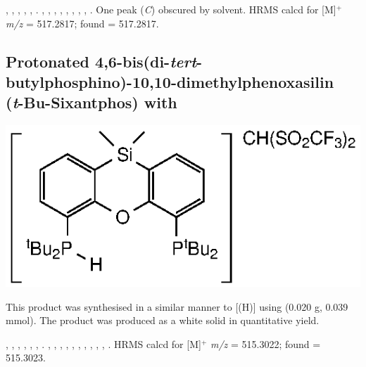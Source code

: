,
,
,
,
,
.
,
,
,
,
,
,
,
,
.
One peak (\emph{C}) obscured by solvent.
HRMS calcd for  [M]$^+$ \emph{m/z} = 517.2817; found = 517.2817.


\subsection*{Protonated 4,6-bis(di-\emph{tert}-butylphosphino)-10,10-dimethylphenoxasilin\\(\emph{t}-Bu-Sixantphos) with }

\begin{structure}[h]
\begin{center}
\includegraphics{../Structures/SitBuH.eps}
\end{center}
\end{structure}

This product was synthesised in a similar manner to [\tBuxantphos(H)] using \tBusixantphos{} (0.020 g, 0.039 mmol).  The product was produced as a white solid in quantitative yield.  

,
,
,
,
,
,
.
,
,
,
,
,
,
,
,
,
,
.
HRMS calcd for  [M]$^+$ \emph{m/z} = 515.3022; found = 515.3023.



